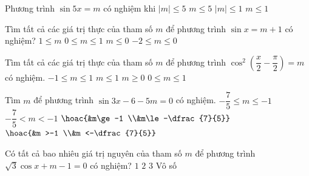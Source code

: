 \begin{ex}%
	Phương trình  $\sin 5x=m$ có nghiệm khi
	 \choice
		 {$\left|m\right|\le 5$}
		 {$m\le 5$}
		{\True $\left|m\right|\le  1$}
		{$m\le  1$}
\end{ex}

\begin{ex}%
	Tìm tất cả các giá trị thực của tham số  $m$ để phương trình $\sin x=m+1$ có nghiệm?
	\choice 
		{$1\le  m$}
		{$0\le  m\le 1$}
		 {$m\le 0$}
		 {\True $-2\le m\le 0$}
\end{ex}

\begin{ex}%
	Tìm tất cả các giá trị thực của tham số  $m$ để phương trình $\cos ^2(\dfrac{x}{2}-\dfrac{\pi}{2})=m$ có nghiệm.
	 \choice
		{$-1\le m\le  1$}
		{$m\le 1$} 
		{$m\ge 0$} 
		 {\True $0\le m\le 1$}
\end{ex}

\begin{ex}%
	Tìm $m$ để phương trình $\sin  3x-6-5m=0$ có nghiệm.
	\choice 
		{\True $-\dfrac{7}{5} \le m\le-1$} 
		{$-\dfrac{7}{5}  < m <-1$}
		{$\hoac{&m\ge-1  \\&m\le-\dfrac{7}{5}}$}
		{$\hoac{&m >-1 \\&m <-\dfrac{7}{5}}$} 
\end{ex}

\begin{ex}%
	Có tất cả bao nhiêu giá trị nguyên của tham số $m$ để phương trình $\sqrt{3} \cos x+m-1=0$ có  nghiệm?
	\choice 
		 {$1$}
		 {$2$}
		{\True $3$} 
		 {Vô số}
\end{ex}


